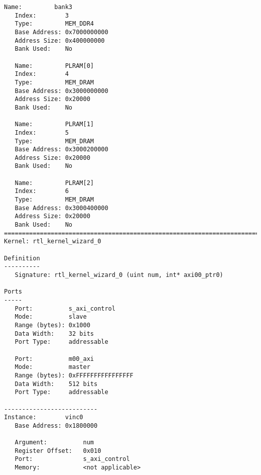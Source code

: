 \begin{lstlisting}[label=some-code-1,caption=Содержимое файла xclbin.info]
   Name:         bank3
   Index:        3
   Type:         MEM_DDR4
   Base Address: 0x7000000000
   Address Size: 0x400000000
   Bank Used:    No

   Name:         PLRAM[0]
   Index:        4
   Type:         MEM_DRAM
   Base Address: 0x3000000000
   Address Size: 0x20000
   Bank Used:    No

   Name:         PLRAM[1]
   Index:        5
   Type:         MEM_DRAM
   Base Address: 0x3000200000
   Address Size: 0x20000
   Bank Used:    No

   Name:         PLRAM[2]
   Index:        6
   Type:         MEM_DRAM
   Base Address: 0x3000400000
   Address Size: 0x20000
   Bank Used:    No
==============================================================================
Kernel: rtl_kernel_wizard_0

Definition
----------
   Signature: rtl_kernel_wizard_0 (uint num, int* axi00_ptr0)

Ports
-----
   Port:          s_axi_control
   Mode:          slave
   Range (bytes): 0x1000
   Data Width:    32 bits
   Port Type:     addressable

   Port:          m00_axi
   Mode:          master
   Range (bytes): 0xFFFFFFFFFFFFFFFF
   Data Width:    512 bits
   Port Type:     addressable

--------------------------
Instance:        vinc0
   Base Address: 0x1800000

   Argument:          num
   Register Offset:   0x010
   Port:              s_axi_control
   Memory:            <not applicable>


\end{lstlisting}
